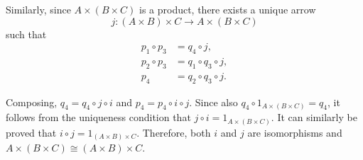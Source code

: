 \documentclass[12pt]{article}
\begin{document}
\begin{enumerate}
    Similarly, since $A \times (B \times C)$ is a product, there exists a unique arrow $$j : (A \times B) \times C \to A \times (B \times C)$$ such that
    \begin{align*}
      p_1 \circ p_3 &= q_4 \circ j,\\
      p_2 \circ p_3 &= q_1 \circ q_3 \circ j,\\
                p_4 &= q_2 \circ q_3 \circ j.
    \end{align*}

    Composing, $q_4 = q_4 \circ j \circ i$ and $p_4 = p_4 \circ i \circ j$. Since also $q_4 \circ 1_{A \times (B \times C)} = q_4$, it follows from the uniqueness condition that $j \circ i = 1_{A \times (B \times C)}$. It can similarly be proved that $i \circ j = 1_{(A \times B) \times C}$. Therefore, both $i$ and $j$ are isomorphisms and $A \times (B \times C) \cong (A \times B) \times C$.

\end{enumerate}
\end{document}
